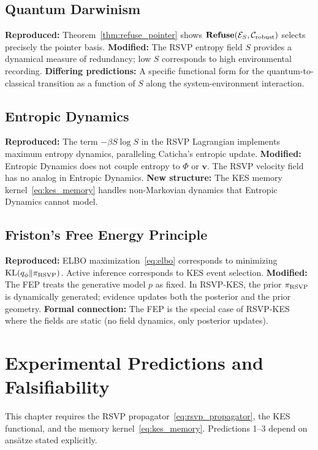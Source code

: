 \documentclass[11pt, openright, twoside]{book}
\theoremstyle{plain}
\theoremstyle{definition}
\theoremstyle{remark}
\newcommand{\vfield}{\mathbf{v}}
\newcommand{\Sfield}{S}
\newcommand{\Refuse}{\mathbf{Refuse}}
\begin{document}
\section{Quantum Darwinism}

\textbf{Reproduced:} Theorem~\ref{thm:refuse_pointer} shows $\Refuse(\mathcal{E}_S,\mathcal{C}_{\rm robust})$
selects precisely the pointer basis.
\textbf{Modified:} The RSVP entropy field $\Sfield$ provides a dynamical measure of
redundancy; low $\Sfield$ corresponds to high environmental recording.
\textbf{Differing predictions:} A specific functional form for the quantum-to-classical
transition as a function of $\Sfield$ along the system-environment interaction.

\section{Entropic Dynamics}

\textbf{Reproduced:} The term $-\beta\Sfield\log\Sfield$ in the RSVP Lagrangian
implements maximum entropy dynamics, paralleling Caticha's entropic update.
\textbf{Modified:} Entropic Dynamics does not couple entropy to $\Phi$ or $\vfield$.
The RSVP velocity field has no analog in Entropic Dynamics.
\textbf{New structure:} The KES memory kernel~\eqref{eq:kes_memory} handles non-Markovian
dynamics that Entropic Dynamics cannot model.

\section{Friston's Free Energy Principle}

\textbf{Reproduced:} ELBO maximization~\eqref{eq:elbo} corresponds to minimizing
$\mathrm{KL}(q_\phi\|\pi_{\rm RSVP})$. Active inference corresponds to KES event selection.
\textbf{Modified:} The FEP treats the generative model $p$ as fixed. In RSVP-KES, the
prior $\pi_{\rm RSVP}$ is dynamically generated; evidence updates both the posterior and
the prior geometry.
\textbf{Formal connection:} The FEP is the special case of RSVP-KES where the fields are
static (no field dynamics, only posterior updates).

\chapter{Experimental Predictions and Falsifiability}

\begin{depbox}
This chapter requires the RSVP propagator~\eqref{eq:rsvp_propagator}, the KES functional,
and the memory kernel~\eqref{eq:kes_memory}. Predictions 1--3 depend on ansätze stated explicitly.
\end{depbox}
\end{document}
